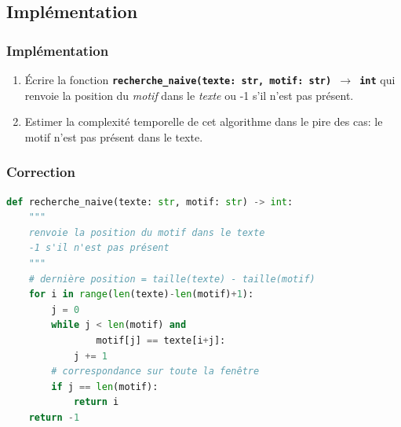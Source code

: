 \documentclass[svgnames,11pt]{beamer}
\begin{document}
\subsection{Implémentation}
\begin{frame}
    \frametitle{Implémentation}

    \begin{activite}
        \begin{enumerate}
            \item Écrire la fonction \textbf{\texttt{recherche\_naive(texte: str, motif: str) $\rightarrow$ int}} qui renvoie la position du \emph{motif} dans le \emph{texte} ou -1 s'il n'est pas présent.
            \item Estimer la complexité temporelle de cet algorithme dans le pire des cas: le motif n'est pas présent dans le texte.
        \end{enumerate}
    \end{activite}

\end{frame}
\begin{frame}[fragile]
    \frametitle{Correction}
\begin{center}
\begin{lstlisting}[language=Python , basicstyle=\ttfamily\small, xleftmargin=0.2em, xrightmargin=0em]
def recherche_naive(texte: str, motif: str) -> int:
    """
    renvoie la position du motif dans le texte
    -1 s'il n'est pas présent
    """
    # dernière position = taille(texte) - taille(motif)
    for i in range(len(texte)-len(motif)+1):
        j = 0
        while j < len(motif) and 
                motif[j] == texte[i+j]:
            j += 1
        # correspondance sur toute la fenêtre
        if j == len(motif): 
            return i
    return -1
\end{lstlisting}
\end{center}

\end{frame}
\end{document}
